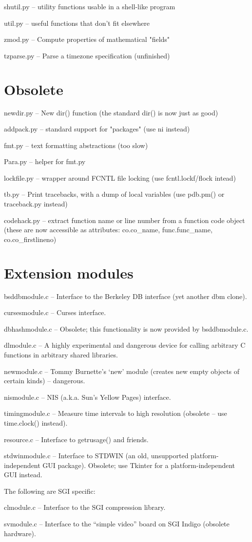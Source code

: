 shutil.py -- utility functions usable in a shell-like program

util.py -- useful functions that don't fit elsewhere

zmod.py -- Compute properties of mathematical "fields"

tzparse.py -- Parse a timezone specification (unfinished)


\section{Obsolete}

newdir.py -- New dir() function (the standard dir() is now just as good)

addpack.py -- standard support for "packages" (use ni instead)

fmt.py -- text formatting abstractions (too slow)

Para.py -- helper for fmt.py

lockfile.py -- wrapper around FCNTL file locking (use
fcntl.lockf/flock intead)

tb.py -- Print tracebacks, with a dump of local variables (use
pdb.pm() or traceback.py instead)

codehack.py -- extract function name or line number from a function
code object (these are now accessible as attributes: co.co_name,
func.func_name, co.co_firstlineno)


\section{Extension modules}

bsddbmodule.c -- Interface to the Berkeley DB interface (yet another
dbm clone).

cursesmodule.c -- Curses interface.

dbhashmodule.c -- Obsolete; this functionality is now provided by
bsddbmodule.c.

dlmodule.c --  A highly experimental and dangerous device for calling
arbitrary C functions in arbitrary shared libraries.

newmodule.c -- Tommy Burnette's `new' module (creates new empty
objects of certain kinds) -- dangerous.

nismodule.c -- NIS (a.k.a. Sun's Yellow Pages) interface.

timingmodule.c -- Measure time intervals to high resolution (obsolete
-- use time.clock() instead).

resource.c -- Interface to getrusage() and friends.

stdwinmodule.c -- Interface to STDWIN (an old, unsupported
platform-independent GUI package).  Obsolete; use Tkinter for a
platform-independent GUI instead.

The following are SGI specific:

clmodule.c -- Interface to the SGI compression library.

svmodule.c -- Interface to the ``simple video'' board on SGI Indigo
(obsolete hardware).
